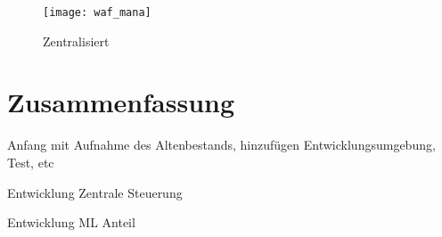 
\begin{figure}[ht]
  \begin{center}
    \texttt{[image: waf\_mana]}
    \caption{Zentralisiert~\cite{Manaseer2018}}
    \label{fig.topten}
  \end{center}
\end{figure}




\section{Zusammenfassung}

\begin{neu}
  Anfang mit Aufnahme des Altenbestands, hinzufügen Entwicklungsumgebung, Test, etc

  Entwicklung Zentrale Steuerung

  Entwicklung ML Anteil
\end{neu}